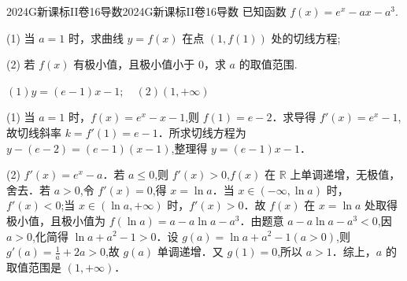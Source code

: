 
\begin{problem}{2024}{G}{新课标II卷}{16}{导数}{2024}{G}{新课标II卷}{16}{导数}
已知函数 $f(x)=e^x-ax-a^3$.

(1) 当 $a=1$ 时，求曲线 $y=f(x)$ 在点 $(1,f(1))$ 处的切线方程;

(2) 若 $f(x)$ 有极小值，且极小值小于 0，求 $a$ 的取值范围.
\end{problem}

\begin{answer}
$(1) y=(e-1)x-1;\quad (2) (1,+\infty)$
\end{answer}

\begin{solutions}
(1) 当 $a=1$ 时，$f(x)=e^x-x-1$,则 $f(1)=e-2$．求导得 $f'(x)=e^x-1$,故切线斜率 $k=f'(1)=e-1$．所求切线方程为 $y-(e-2)=(e-1)(x-1)$,整理得 $y=(e-1)x-1$．

 (2) $f'(x)=e^x-a$．若 $a\le 0$,则 $f'(x)>0$,$f(x)$ 在 $\mathbb{R}$ 上单调递增，无极值，舍去．若 $a>0$,令 $f'(x)=0$,得 $x=\ln a$．当 $x\in(-\infty,\ln a)$ 时，$f'(x)<0$;当 $x\in(\ln a,+\infty)$ 时，$f'(x)>0$．故 $f(x)$ 在 $x=\ln a$ 处取得极小值，且极小值为 $f(\ln a)=a-a\ln a-a^3$．由题意 $a-a\ln a-a^3<0$,因 $a>0$,化简得 $\ln a+a^2-1>0$．设 $g(a)=\ln a+a^2-1(a>0)$,则 $g'(a)=\frac{1}{a}+2a>0$,故 $g(a)$ 单调递增．又 $g(1)=0$,所以 $a>1$．综上，$a$ 的取值范围是 $(1,+\infty)$．
\end{solutions}